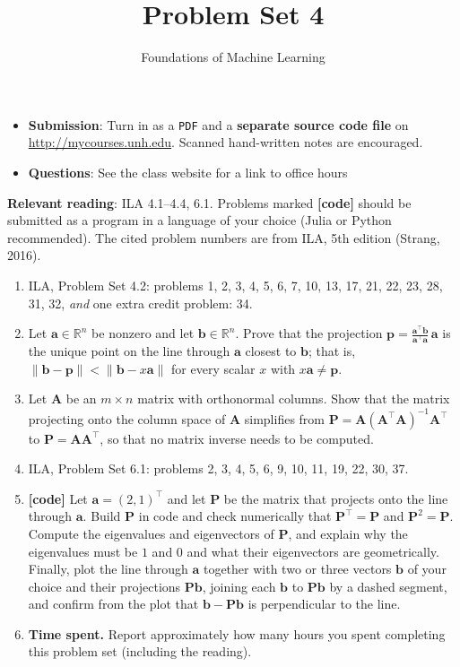 \documentclass[letterpaper]{article}
\title{Problem Set 4}
\author{Foundations of Machine Learning}
\date{}
\newcommand{\Real}{\mathbb{R}}
\newcommand{\tr}{^\top}
\begin{document}
\maketitle

\begin{itemize}
\item \textbf{Submission}: Turn in as a \texttt{PDF} and a \textbf{separate source code file} on \url{http://mycourses.unh.edu}. Scanned hand-written notes are encouraged.
\item \textbf{Questions}: See the class website for a link to office hours
\end{itemize}


\textbf{Relevant reading}: ILA 4.1--4.4, 6.1. Problems marked \textbf{[code]} should be submitted as a program in a language of your choice (Julia or Python recommended). The cited problem numbers are from ILA, 5th edition (Strang, 2016).

\begin{enumerate}
\item ILA, Problem Set 4.2: problems 1, 2, 3, 4, 5, 6, 7, 10, 13, 17, 21, 22, 23, 28, 31, 32, \emph{and} one extra credit problem: 34.
\item Let $\bm{a} \in \Real^n$ be nonzero and let $\bm{b} \in \Real^n$. Prove that the
  projection $\bm{p} = \frac{\bm{a}\tr \bm{b}}{\bm{a}\tr \bm{a}} \, \bm{a}$ is the unique
  point on the line through $\bm{a}$ closest to $\bm{b}$; that is,
  $\|\bm{b} - \bm{p}\| < \|\bm{b} - x\bm{a}\|$ for every scalar $x$ with $x\bm{a} \neq \bm{p}$.
\item Let $\bm{A}$ be an $m \times n$ matrix with orthonormal columns. Show that the matrix
  projecting onto the column space of $\bm{A}$ simplifies from
  $\bm{P} = \bm{A}(\bm{A}\tr\bm{A})^{-1}\bm{A}\tr$ to $\bm{P} = \bm{A}\bm{A}\tr$, so that no
  matrix inverse needs to be computed.
\item ILA, Problem Set 6.1: problems 2, 3, 4, 5, 6, 9, 10, 11, 19, 22, 30, 37.
\item \textbf{[code]} Let $\bm{a} = (2,1)\tr$ and let $\bm{P}$ be the matrix that projects
  onto the line through $\bm{a}$. Build $\bm{P}$ in code and check numerically that
  $\bm{P}\tr = \bm{P}$ and $\bm{P}^2 = \bm{P}$. Compute the eigenvalues and eigenvectors of
  $\bm{P}$, and explain why the eigenvalues must be $1$ and $0$ and what their eigenvectors
  are geometrically. Finally, plot the line through $\bm{a}$ together with two or three
  vectors $\bm{b}$ of your choice and their projections $\bm{P}\bm{b}$, joining each
  $\bm{b}$ to $\bm{P}\bm{b}$ by a dashed segment, and confirm from the plot that
  $\bm{b} - \bm{P}\bm{b}$ is perpendicular to the line.
\item \textbf{Time spent.} Report approximately how many hours you spent completing this problem set (including the reading).
\end{enumerate}
\end{document}
